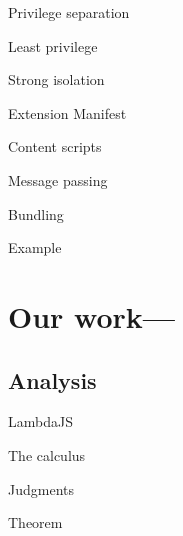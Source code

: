 \documentclass[11pt]{beamer}
\begin{document}
\begin{frame}{Privilege separation}

\end{frame}

\begin{frame}{Least privilege}

\end{frame}

\begin{frame}{Strong isolation}

\end{frame}

\begin{frame}{Extension Manifest}

\end{frame}

\begin{frame}{Content scripts}

\end{frame}

\begin{frame}{Message passing}

\end{frame}

\begin{frame}{Bundling}

\end{frame}

\begin{frame}{Example}

\end{frame}

\section{Our work---}
\subsection{Analysis}
\begin{frame}{LambdaJS}

\end{frame}

\begin{frame}{The calculus}

\end{frame}

\begin{frame}{Judgments}

\end{frame}

\begin{frame}{Theorem}

\end{frame}
\end{document}
